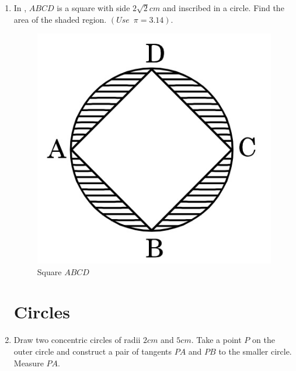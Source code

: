 \documentclass[2pt,-letter paper]{article}
\begin{document}
\begin{enumerate}
\item In  , $ABCD$ is a square with side $2\sqrt{2}cm$ and inscribed in a circle. Find the area of the shaded region. $(Use \hspace{6pt}\pi = 3.14)$.
\begin{figure}[H]
    \centering
    \includegraphics[width=\columnwidth]{img5.jpg}
    \caption{Square $ABCD$ }
    \label{fig:Fig_5}
\end{figure}


\section{Circles}

\item Draw two concentric circles of radii $2 cm$ and $5 cm$. Take a point $P$ on the outer circle and construct a pair of tangents $PA$ and $PB$ to the smaller circle. Measure $PA$.  



\end{enumerate}
\end{document}
